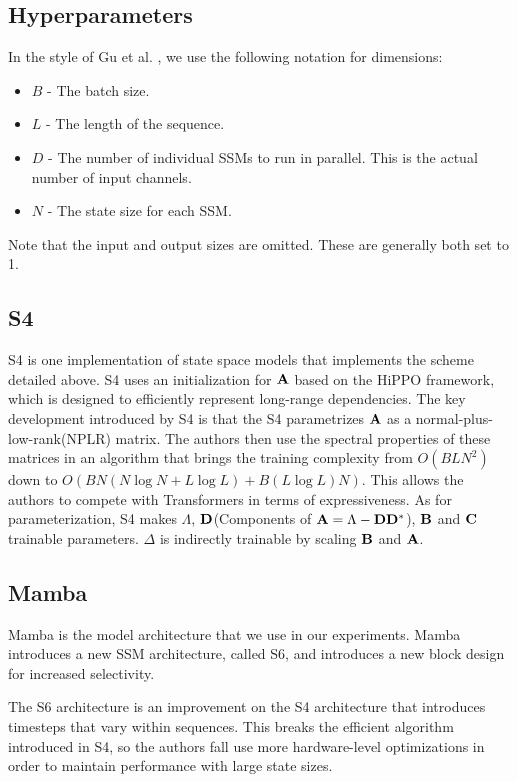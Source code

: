 \subsection{Hyperparameters}
In the style of Gu et al. \cite{s4}, we use the following notation for
dimensions:
\begin{itemize}
    \item $B$ - The batch size.
    \item $L$ - The length of the sequence.
    \item $D$ - The number of individual SSMs to run in parallel. This is the
    actual number of input channels.
    \item $N$ - The state size for each SSM.
\end{itemize}
Note that the input and output sizes are omitted.
These are generally both set to 1.

\subsection{S4}
S4\cite{s4} is one implementation of state space models that implements the
scheme detailed above.
S4 uses an initialization for ${\mathbf{A}}$ based on the HiPPO framework, which is
designed to efficiently represent long-range dependencies.
The key development introduced by S4 is that the S4 parametrizes ${\mathbf{A}}$ as a
normal-plus-low-rank(NPLR) matrix. The authors then use the spectral properties
of these matrices in an algorithm that brings the training complexity from
$O(BLN^2)$ down to $O(BN(N \log N + L \log L) + B(L \log L)N)$\cite{s4}.
This allows the authors to compete with Transformers in terms of expressiveness.
As for parameterization, S4 makes $\Lambda$, ${\mathbf{D}}$(Components of
${\mathbf{A}} = \Lambda - {\mathbf{D}}{\mathbf{D}}^*$), ${\mathbf{B}}$ and ${\mathbf{C}}$ trainable parameters.
$\Delta$ is indirectly trainable by scaling ${\mathbf{B}}$ and ${\mathbf{A}}$.

\subsection{Mamba}
Mamba\cite{mamba} is the model architecture that we use in our experiments.
Mamba introduces a new SSM architecture, called S6, and introduces a new block
design for increased selectivity.

The S6 architecture is an improvement on the S4 architecture that introduces
timesteps that vary within sequences.
This breaks the efficient algorithm introduced in S4, so the authors fall use
more hardware-level optimizations in order to maintain performance with large
state sizes.

